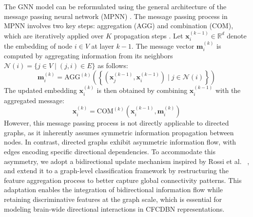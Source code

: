 \documentclass[lettersize,journal]{IEEEtran}
\begin{document}
The GNN model can be reformulated using the general architecture of the message passing neural network (MPNN)  \cite{gilmer2017neural}. The message passing process in MPNN involves two key steps: aggregation (AGG) and combination (COM), which are iteratively applied over \( K \) propagation steps  \cite{xu2018powerful}. 
Let \( \mathbf{x}_i^{(k-1)} \in \mathbb{R}^d \) denote the embedding of node \( i \in V \) at layer \( k-1 \). The message vector \( \mathbf{m}_i^{(k)} \) is computed by aggregating information from its neighbors \( \mathcal{N}(i) = \{ j \in V \mid (j, i) \in E \} \) as follows:
\begin{equation}
\mathbf{m}_i^{(k)} = \text{AGG}^{(k)} \left( \left\{ (\mathbf{x}_j^{(k-1)}, \mathbf{x}_i^{(k-1)}) \mid j \in \mathcal{N}(i) \right\} \right)
\label{16}
\end{equation}
The updated embedding \( \mathbf{x}_i^{(k)} \) is then obtained by combining \( \mathbf{x}_i^{(k-1)} \) with the aggregated message:
\begin{equation}
\mathbf{x}_i^{(k)} = \text{COM}^{(k)} \left( \mathbf{x}_i^{(k-1)}, \mathbf{m}_i^{(k)} \right)
\end{equation}
However, this message passing process is not directly applicable to directed graphs, as it inherently assumes symmetric information propagation between nodes. In contrast, directed graphs exhibit asymmetric information flow, with edges encoding specific directional dependencies.
To accommodate this asymmetry, we adopt a bidirectional update mechanism inspired by Rossi et al.~ \cite{rossi2024edge}, and extend it to a graph-level classification framework by restructuring the feature aggregation process to better capture global connectivity patterns. This adaptation enables the integration of bidirectional information flow while retaining discriminative features at the graph scale, which is essential for modeling brain-wide directional interactions in CFCDBN representations.
\end{document}
